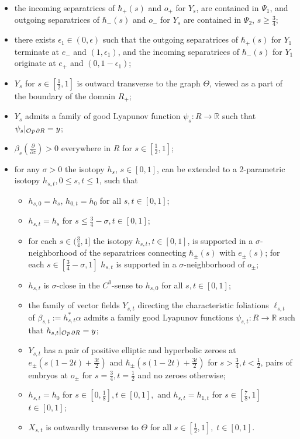 \documentclass[10pt,a4paper]{amsart}
\newcommand{\Op}{ {\mathcal O}{\it p}\,}
\newcommand{\R}{\mathbb{R}}
\newcommand{\eps}{\epsilon}
\newcommand{\p}{\partial}
\begin{document}
\begin{lemma}
\begin{itemize}
\item[c)] the incoming separatrices of $\hbar_+(s)$   and $o_+$  for $Y_s$,    are  contained in $\Psi_1$, and outgoing separatrices
of $\hbar_-(s)$   and $o_-$  for $Y_s$ are  contained in $\Psi_2$,  $s\geq 
\frac34$;
 \item[d)] there exists $\eps_1\in(0,\eps)$ such that the outgoing separatrices of $\hbar_+(s)$ for $Y_1$ terminate at $e_-$ and $(1,\eps_1 )$, and the   incoming separatrices of $\hbar_-(s)$ for $Y_1$ originate at $e_+$ and $(0,1-\eps_1)$; 
\item[f)]   $Y_s$  for $s\in[\frac12,1]$ is outward transverse  to the graph 
$\Theta$, viewed as a  part of the boundary of the domain $R_+$;
\item[g)]   $Y_{s}$ admits   a  family of good Lyapunov function  $\psi_{s}:R\to\R$   such that  $\psi_{s}|_{\Op\p R}=y$;
\item[h)] $\beta_s(\frac{\p}{\p z})>0$  everywhere in $R$ for $s\in[\frac12,1]$;
\item[i)]  for any $\sigma>0$  the isotopy $h_s$, $s\in[0,1]$,  can be extended to a  2-parametric isotopy $h_{s,t}, 0\leq s,t\leq1$,  such that
\begin{itemize}
\item $h_{s,0}=h_s$, $h_{0,t}=h_0$ for all $s,t\in[0,1]$;
\item $h_{s,t}=h_{s}$   for $s\leq\frac34-\sigma, t\in[0,1]$;
\item for each $s\in(\frac34,1]$  the isotopy $h_{s,t},t\in[0,1]$, is supported in a    $\sigma$-neighborhood of the separatrices  connecting $\hbar_\pm(s)$ with $e_\pm(s)$;   for each $s\in[\frac34-\sigma,1]$ $h_{s,t}$ is supported in a    $\sigma$-neighborhood of $o_\pm$;  
 \item $h_{s,t}$ is   $\sigma$-close in the $C^0$-sense to $h_{s,0}$ for all $s,t\in[0,1]$;
\item  the family of vector fields  $Y_{s,t}$ directing the characteristic foliations $\ell_{s,t}$ of $\beta_{s,t}:=h_{s,t}^*\alpha$ admits a  family  good Lyapunov functions  $\psi_{s,t}:R\to\R$   such that  $h_{s,t}|_{\Op\p R}=y$;
\item $Y_{s,t}$ has a pair  of positive elliptic and hyperbolic zeroes at
$e_\pm(s(1-2t) +\frac{3t}2)$ and $\hbar_\pm(s(1-2t) +\frac{3t}2)$ for $s>\frac34, t<\frac12$, pairs of embryos at $o_\pm$ for $s=\frac34, t=\frac12$ and no zeroes otherwise;
\item $h_{s,t}=h_{0}$ for $s\in[0,\frac18], t\in[0,1],$ and $h_{s,t}=h_{1,t}$ for $s\in[\frac78,1]$    $t\in[0,1]$;
\item $X_{s,t}$ is outwardly transverse to $\Theta$ for all $s\in[\frac12,1],\; t\in[0,1]$.
  \end{itemize}
 
\end{itemize}

\end{lemma}
\end{document}
